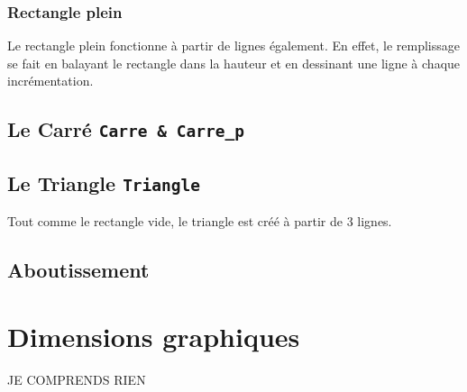 \documentclass[11pt]{article}
\begin{document}
\subsubsection{Rectangle plein}

Le rectangle plein fonctionne à partir de lignes également. En effet, le remplissage se fait en balayant le rectangle dans la hauteur et en dessinant une ligne à chaque incrémentation.

\subsection{Le Carré \texttt{Carre \& Carre\_p}}


\subsection{Le Triangle \texttt{Triangle}}

Tout comme le rectangle vide, le triangle est créé à partir de 3 lignes.


\subsection{ Aboutissement }


\section{Dimensions graphiques}

JE COMPRENDS RIEN
\end{document}
